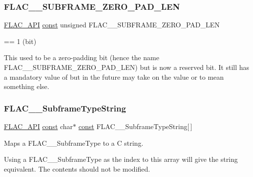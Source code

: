 \subsubsection{\texorpdfstring{F\+L\+A\+C\+\_\+\+\_\+\+S\+U\+B\+F\+R\+A\+M\+E\+\_\+\+Z\+E\+R\+O\+\_\+\+P\+A\+D\+\_\+\+L\+EN}{FLAC\_\_SUBFRAME\_ZERO\_PAD\_LEN}}
{\footnotesize\ttfamily \hyperlink{group__flac__export_ga56ca07df8a23310707732b1c0007d6f5}{F\+L\+A\+C\+\_\+\+A\+PI} \hyperlink{zconf_8h_a2c212835823e3c54a8ab6d95c652660e}{const} unsigned F\+L\+A\+C\+\_\+\+\_\+\+S\+U\+B\+F\+R\+A\+M\+E\+\_\+\+Z\+E\+R\+O\+\_\+\+P\+A\+D\+\_\+\+L\+EN}

== 1 (bit)

This used to be a zero-\/padding bit (hence the name F\+L\+A\+C\+\_\+\+\_\+\+S\+U\+B\+F\+R\+A\+M\+E\+\_\+\+Z\+E\+R\+O\+\_\+\+P\+A\+D\+\_\+\+L\+EN) but is now a reserved bit. It still has a mandatory value of {} but in the future may take on the value {} or {} to mean something else. \mbox{\label{group__flac__format_gabc358f252630dfc52e875eb05c3b0fd9}} 
\subsubsection{\texorpdfstring{F\+L\+A\+C\+\_\+\+\_\+\+Subframe\+Type\+String}{FLAC\_\_SubframeTypeString}}
{\footnotesize\ttfamily \hyperlink{group__flac__export_ga56ca07df8a23310707732b1c0007d6f5}{F\+L\+A\+C\+\_\+\+A\+PI} \hyperlink{zconf_8h_a2c212835823e3c54a8ab6d95c652660e}{const} char$\ast$ \hyperlink{zconf_8h_a2c212835823e3c54a8ab6d95c652660e}{const} F\+L\+A\+C\+\_\+\+\_\+\+Subframe\+Type\+String\mbox{[}$\,$\mbox{]}}

Maps a F\+L\+A\+C\+\_\+\+\_\+\+Subframe\+Type to a C string.

Using a F\+L\+A\+C\+\_\+\+\_\+\+Subframe\+Type as the index to this array will give the string equivalent. The contents should not be modified. \mbox{\label{group__flac__format_gac05d5441acd3daad33d287165c450a05}} 
